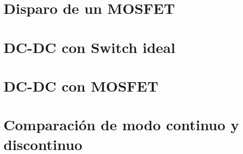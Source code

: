 







\tableofcontents
\newpage


\section{Disparo de un MOSFET}

\section{DC-DC con Switch ideal}

\section{DC-DC con MOSFET}

\section{Comparación de modo continuo y discontinuo}




